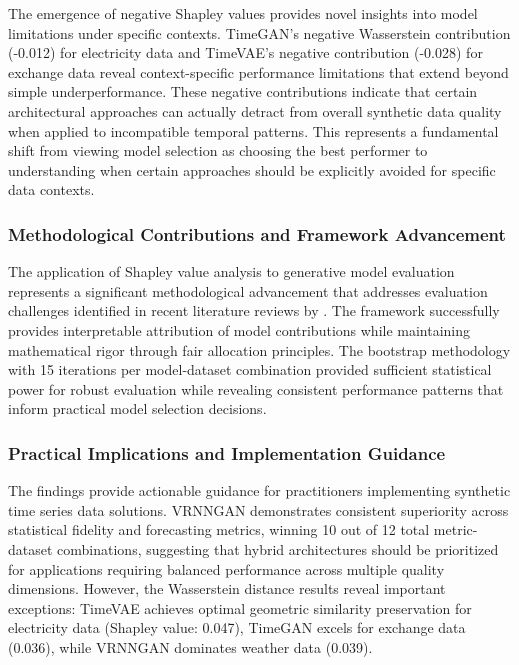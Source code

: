 \documentclass[11pt]{article}
\begin{document}
The emergence of negative Shapley values provides novel insights into model limitations under specific contexts. TimeGAN's negative Wasserstein contribution (-0.012) for electricity data and TimeVAE's negative contribution (-0.028) for exchange data reveal context-specific performance limitations that extend beyond simple underperformance. These negative contributions indicate that certain architectural approaches can actually detract from overall synthetic data quality when applied to incompatible temporal patterns. This represents a fundamental shift from viewing model selection as choosing the best performer to understanding when certain approaches should be explicitly avoided for specific data contexts.

\subsubsection*{Methodological Contributions and Framework Advancement}

The application of Shapley value analysis to generative model evaluation represents a significant methodological advancement that addresses evaluation challenges identified in recent literature reviews by \textcite{goyal_systematic_2024}. The framework successfully provides interpretable attribution of model contributions while maintaining mathematical rigor through fair allocation principles. The bootstrap methodology with 15 iterations per model-dataset combination provided sufficient statistical power for robust evaluation while revealing consistent performance patterns that inform practical model selection decisions.

\subsubsection*{Practical Implications and Implementation Guidance}

The findings provide actionable guidance for practitioners implementing synthetic time series data solutions. VRNNGAN demonstrates consistent superiority across statistical fidelity and forecasting metrics, winning 10 out of 12 total metric-dataset combinations, suggesting that hybrid architectures should be prioritized for applications requiring balanced performance across multiple quality dimensions. However, the Wasserstein distance results reveal important exceptions: TimeVAE achieves optimal geometric similarity preservation for electricity data (Shapley value: 0.047), TimeGAN excels for exchange data (0.036), while VRNNGAN dominates weather data (0.039).
\end{document}
